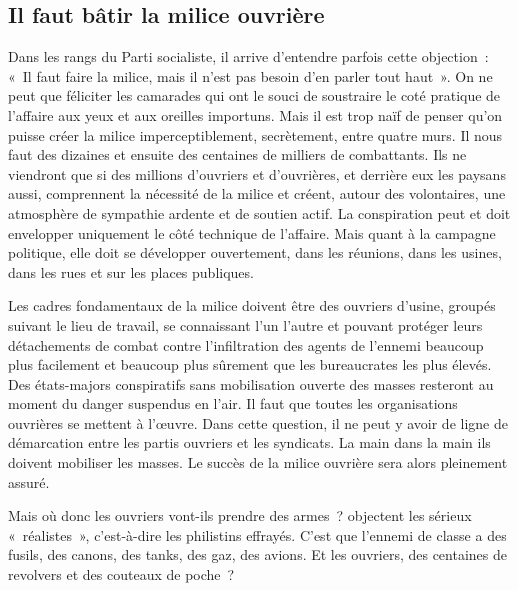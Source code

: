 \documentclass[french,twoside]{book} %
\begin{document}
 \subsection[{Il faut bâtir la milice ouvrière}]{Il faut bâtir la milice ouvrière}
\noindent Dans les rangs du Parti socialiste, il arrive d’entendre parfois cette objection : « Il faut faire la milice, mais il n’est pas besoin d’en parler tout haut ». On ne peut que féliciter les camarades qui ont le souci de soustraire le coté pratique de l’affaire aux yeux et aux oreilles importuns. Mais il est trop naïf de penser qu’on puisse créer la milice imperceptiblement, secrètement, entre quatre murs. Il nous faut des dizaines et ensuite des centaines de milliers de combattants. Ils ne viendront que si des millions d’ouvriers et d’ouvrières, et derrière eux les paysans aussi, comprennent la nécessité de la milice et créent, autour des volontaires, une atmosphère de sympathie ardente et de soutien actif. La conspiration peut et doit envelopper uniquement le côté technique de l’affaire. Mais quant à la campagne politique, elle doit se développer ouvertement, dans les réunions, dans les usines, dans les rues et sur les places publiques.\par
Les cadres fondamentaux de la milice doivent être des ouvriers d’usine, groupés suivant le lieu de travail, se connaissant l’un l’autre et pouvant protéger leurs détachements de combat contre l’infiltration des agents de l’ennemi beaucoup plus facilement et beaucoup plus sûrement que les bureaucrates les plus élevés. Des états-majors conspiratifs sans mobilisation ouverte des masses resteront au moment du danger suspendus en l’air. Il faut que toutes les organisations ouvrières se mettent à l’œuvre. Dans cette question, il ne peut y avoir de ligne de démarcation entre les partis ouvriers et les syndicats. La main dans la main ils doivent mobiliser les masses. Le succès de la milice ouvrière sera alors pleinement assuré.\par
Mais où donc les ouvriers vont-ils prendre des armes ? objectent les sérieux « réalistes », c’est-à-dire les philistins effrayés. C’est que l’ennemi de classe a des fusils,  des canons, des tanks, des gaz, des avions. Et les ouvriers, des centaines de revolvers et des couteaux de poche ?\par
\end{document}
